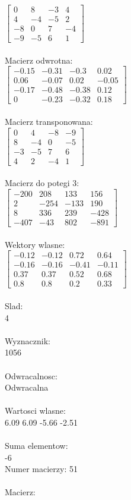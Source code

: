 \documentclass[a4paper,12pt]{article}
\begin{document}
$\begin{bmatrix} 0&8&-3&4\\4&-4&-5&2\\-8&0&7&-4\\-9&-5&6&1 \end{bmatrix}$
\\
\\
Macierz odwrotna:\\

$\begin{bmatrix} -0.15&-0.31&-0.3&0.02\\0.06&-0.07&0.02&-0.05\\-0.17&-0.48&-0.38&0.12\\0&-0.23&-0.32&0.18 \end{bmatrix}$
\\
\\
Macierz transponowana:\\

$\begin{bmatrix} 0&4&-8&-9\\8&-4&0&-5\\-3&-5&7&6\\4&2&-4&1 \end{bmatrix}$
\\
\\
Macierz do potegi 3:\\

$\begin{bmatrix} -200&208&133&156\\2&-254&-133&190\\8&336&239&-428\\-407&-43&802&-891 \end{bmatrix}$
\\
\\
Wektory wlasne:\\

$\begin{bmatrix} -0.12&-0.12&0.72&0.64\\-0.16&-0.16&-0.41&-0.11\\0.37&0.37&0.52&0.68\\0.8&0.8&0.2&0.33 \end{bmatrix}$
\\
\\
Slad:\\
4
\\
\\
Wyznacznik:\\
1056
\\
\\
Odwracalnosc:\\
Odwracalna
\\
\\
Wartosci wlasne:\\
6.09 6.09 -5.66 -2.51
\\
\\
Suma elementow:\\
-6
\\
\newpage
Numer macierzy:
51
\\
\\
Macierz:\\
\end{document}
